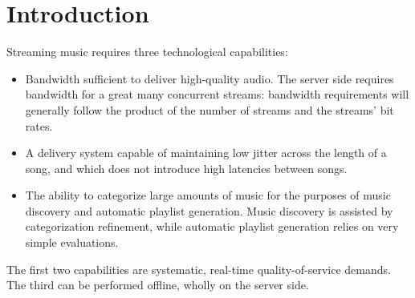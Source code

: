 \documentclass[]{sigplanconf}
\begin{document}
\section{Introduction}
Streaming music requires three technological capabilities:
\begin{itemize}
\item Bandwidth sufficient to deliver high-quality audio. The server side
	requires bandwidth for a great many concurrent streams: bandwidth
	requirements will generally follow the product of the number of streams
	and the streams' bit rates.
\item A delivery system capable of maintaining low jitter across the length
	of a song, and which does not introduce high latencies between songs.
\item The ability to categorize large amounts of music for the purposes of
	music discovery and automatic playlist generation. Music discovery
	is assisted by categorization refinement, while automatic playlist
	generation relies on very simple evaluations.
\end{itemize}
The first two capabilities are systematic, real-time quality-of-service
demands. The third can be performed offline, wholly on the server side.
\end{document}
